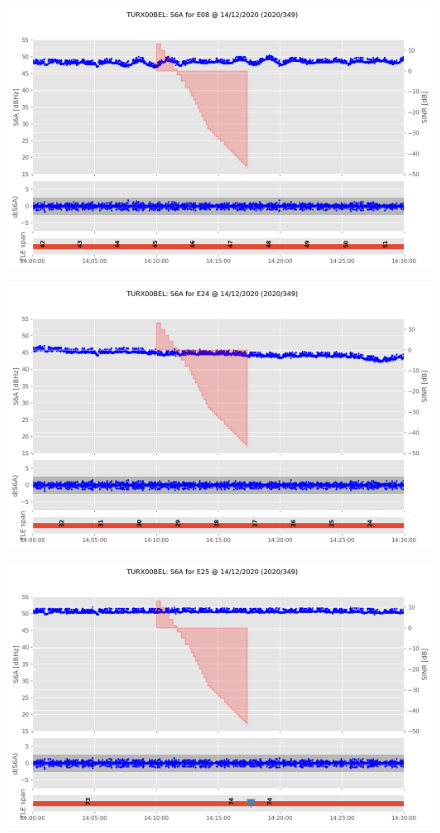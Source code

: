 \begin{enumerate}
%


\begin{figure}[H]%
\centering%
\includegraphics[width=0.95\linewidth]{png/TURX00BEL_R_20203491400_30M_01S_MO_E-S6A-E08.png}%
\end{figure}

%


\begin{figure}[H]%
\centering%
\includegraphics[width=0.95\linewidth]{png/TURX00BEL_R_20203491400_30M_01S_MO_E-S6A-E24.png}%
\end{figure}

%


\begin{figure}[H]%
\centering%
\includegraphics[width=0.95\linewidth]{png/TURX00BEL_R_20203491400_30M_01S_MO_E-S6A-E25.png}%
\end{figure}


\end{enumerate}
